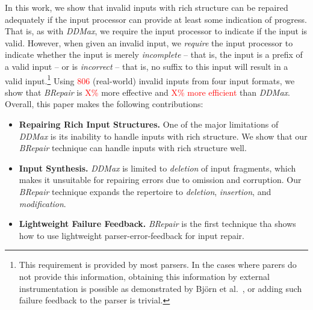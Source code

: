 \documentclass[sigconf,review,anonymous]{acmart}
\newcounter{todocounter}
\newcommand{\todo}[1]{\marginpar{$|$}\textcolor{red}{\stepcounter{todocounter}\footnote[\thetodocounter]{\textcolor{red}{\textbf{TODO }}\textit{#1}}}}
\newcommand{\recheck}[1]{\textcolor{red}{#1}}
\renewcommand{\todo}[1]{}
\newcommand{\ddmax}{\textit{DDMax}\xspace}
\newcommand{\brepair}{\textit{BRepair}\xspace}
\begin{document}
\todo{we need to emphasize the main novelty here, i.e, first to do X, to the best of our knowledge }
In this work, we %
show that invalid inputs with rich structure can be repaired adequately if
the input processor can provide at least some indication of progress.
That is, as with \ddmax, we require the input processor to indicate if the input
is valid.  However, when given an invalid input, we \textit{require} the input processor
to indicate whether the input is merely \emph{incomplete} -- that is, the input
is a prefix of a valid input -- or is \emph{incorrect} -- that is, no suffix to
this input will result in a valid input.\footnote{This requirement is
provided by most parsers. %
In the cases where parers do not provide
this information, obtaining this information by external instrumentation is
possible as demonstrated by Bj\"orn et al.~\cite{mathis2019parser}, or
adding such failure feedback to the parser %
is trivial.
}
Using \recheck{806} (real-world) invalid inputs from four input formats, we show that %
\brepair is \recheck{X\%} more effective and \recheck{X\% more efficient} %
than \ddmax.
Overall, this paper makes the following %
contributions\todo{we need to stress some results here}:
\begin{itemize}
\item \textbf{Repairing Rich Input Structures.} One of the major limitations of
\ddmax is its inability to handle inputs with rich structure. We show that our
\brepair technique can handle inputs with rich structure well.
\item \textbf{Input Synthesis.} \ddmax is limited to \emph{deletion} of input
fragments, which makes it unsuitable for repairing errors due to omission and
corruption. Our \brepair technique expands the repertoire to \emph{deletion},
\emph{insertion}, and \emph{modification}.
\item \textbf{Lightweight Failure Feedback.} \brepair is the first technique
tha shows how to use lightweight parser-error-feedback for input repair.
\end{itemize}
\end{document}
